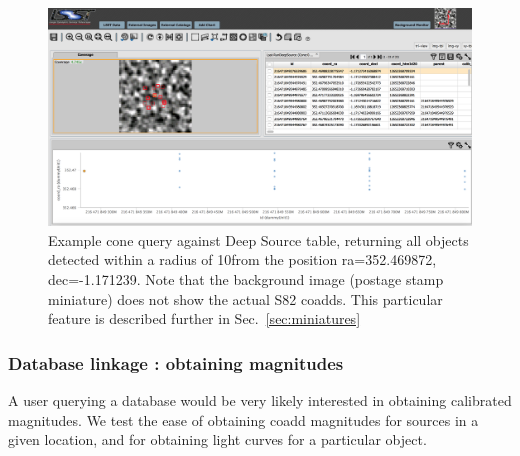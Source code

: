 \documentclass[DM,lsstdraft,toc,usenatbib]{lsstdoc}
\begin{document}
\begin{figure}
\includegraphics[width=\textwidth]{figs/3_PDAC_cone_DeepSource}
\caption{Example cone query against Deep Source table, returning all objects detected within a radius of 10\arcsec from the position ra=352.469872\degree , dec=-1.171239\degree. Note that the background image (postage stamp miniature) does not show the actual S82 coadds. This particular feature is described further in Sec.~\ref{sec:miniatures}}
\label{fig:PDAC_cone_DS}
\end{figure}



\subsubsection{Database linkage : obtaining magnitudes}
\label{sec:linkage_magnitudes}

A user querying a database would be very likely interested in obtaining calibrated magnitudes. We test the ease of obtaining coadd magnitudes  for sources in a given location,  and for obtaining light curves for a particular object. 
\end{document}
